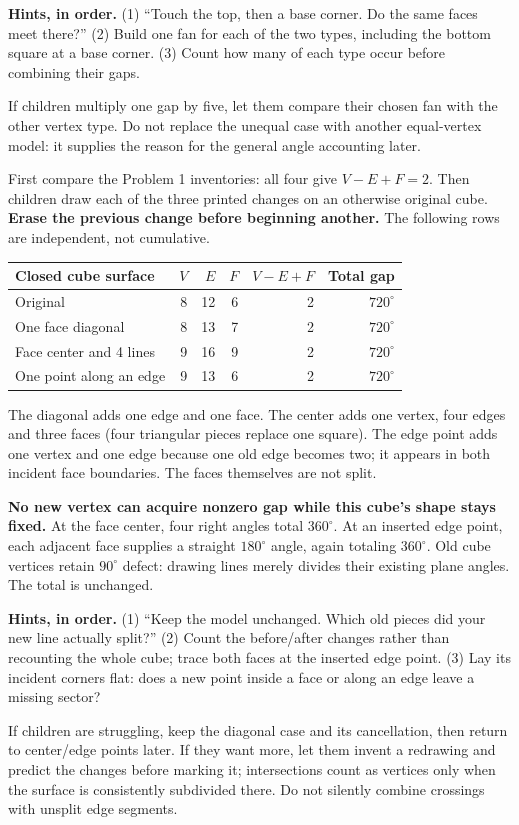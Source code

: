\documentclass[11pt,letterpaper]{article}
\newcommand{\sub}[1]{\par\vspace{3pt}{\bfseries #1}\par}
\newcommand{\hints}[3]{\textbf{Hints, in order.} (1) #1 (2) #2 (3) #3\par}
\newcommand{\degc}{^{\circ}}
\begin{document}
\hints{``Touch the top, then a base corner. Do the same faces meet there?''}{Build one fan for each of the two types, including the bottom square at a base corner.}{Count how many of each type occur before combining their gaps.}
If children multiply one gap by five, let them compare their chosen fan with the other vertex type. Do not replace the unequal case with another equal-vertex model: it supplies the reason for the general angle accounting later.

\sub{Problem 6 / student p.6 / Grades 2--5; upper concrete core or return visit}
First compare the Problem 1 inventories: all four give $V-E+F=2$. Then children draw each of the three printed changes on an otherwise original cube. \textbf{Erase the previous change before beginning another.} The following rows are independent, not cumulative.

\begin{center}
\begin{tabular}{|l|r|r|r|r|r|}\hline
Closed cube surface & $V$ & $E$ & $F$ & $V-E+F$ & Total gap\\\hline
Original & 8 & 12 & 6 & 2 & $720\degc$\\
One face diagonal & 8 & 13 & 7 & 2 & $720\degc$\\
Face center and 4 lines & 9 & 16 & 9 & 2 & $720\degc$\\
One point along an edge & 9 & 13 & 6 & 2 & $720\degc$\\\hline
\end{tabular}
\end{center}
The diagonal adds one edge and one face. The center adds one vertex, four edges and three faces (four triangular pieces replace one square). The edge point adds one vertex and one edge because one old edge becomes two; it appears in both incident face boundaries. The faces themselves are not split.

\textbf{No new vertex can acquire nonzero gap while this cube's shape stays fixed.} At the face center, four right angles total $360\degc$. At an inserted edge point, each adjacent face supplies a straight $180\degc$ angle, again totaling $360\degc$. Old cube vertices retain $90\degc$ defect: drawing lines merely divides their existing plane angles. The total is unchanged.

\hints{``Keep the model unchanged. Which old pieces did your new line actually split?''}{Count the before/after changes rather than recounting the whole cube; trace both faces at the inserted edge point.}{Lay its incident corners flat: does a new point inside a face or along an edge leave a missing sector?}
If children are struggling, keep the diagonal case and its cancellation, then return to center/edge points later. If they want more, let them invent a redrawing and predict the changes before marking it; intersections count as vertices only when the surface is consistently subdivided there. Do not silently combine crossings with unsplit edge segments.
\end{document}
